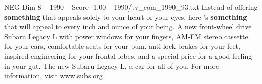 \begin{textsample}{NEG Dim 8 – 1990 – Score -1.00 – 1990/tv\_com\_1990\_93.txt}  \label{ex:f8_neg_021}
Instead of offering \textbf{something} that appeals solely to your heart or your eyes, here 's \textbf{something} that will appeal to every inch and ounce of your being.
A new front-wheel drive Subaru Legacy L with power windows for your fingers, AM-FM stereo cassette for your ears, comfortable seats for your bum, anti-lock brakes for your feet, inspired engineering for your frontal lobes, and a special price for a good feeling in your gut.
The new Subaru Legacy L, a car for all of you.
For more information, visit www.subs.org

\end{textsample}
